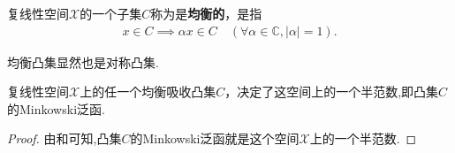 \documentclass[../../main.tex]{subfiles}%
\begin{document}
\begin{definition}
复线性空间$\mathscr{X}$的一个子集$C$称为是\textbf{均衡的}，是指
\begin{align*}
x \in C \implies \alpha x \in C \quad (\forall \alpha \in \mathbb{C}, |\alpha| = 1).
\end{align*}
\end{definition}
\begin{remark}
均衡凸集显然也是对称凸集.
\end{remark}

\begin{proposition}\label{proposition:泛函分析--命题1.5.10}
复线性空间$\mathscr{X}$上的任一个均衡吸收凸集$C$，决定了这空间上的一个半范数,即凸集$C$的Minkowski泛函.
\end{proposition}
\begin{proof}
由和可知,凸集$C$的Minkowski泛函就是这个空间$\mathscr{X}$上的一个半范数.
\end{proof}
\end{document}
